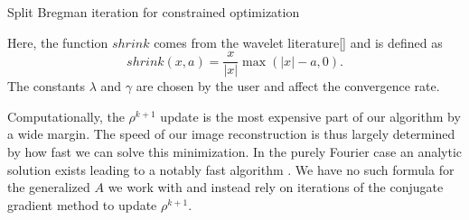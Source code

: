 \documentclass[12pt]{amsart}
\theoremstyle{remark}
\begin{document}
\begin{algorithm}[H]
\caption{Split Bregman iteration for constrained optimization}
\label{sbalgo}


\end{algorithm}


Here, the function $shrink$ comes from the wavelet literature[] and is defined as
\begin{equation}
shrink(x,a) = \frac{x}{|x|} \max (|x|-a,0).
\end{equation}
The constants $\lambda$ and $\gamma$ are chosen by the user and affect the convergence rate.

Computationally, the $\rho^{k+1}$ update is the most expensive part of our algorithm by a wide margin. The speed of our image reconstruction is thus largely determined by how fast we can solve this minimization. In the purely Fourier case an analytic solution exists leading to a notably fast algorithm \cite{Goldstein2009a}. We have no such formula for the generalized $A$ we work with and instead rely on iterations of the conjugate gradient method to update $\rho^{k+1}$.
\end{document}
